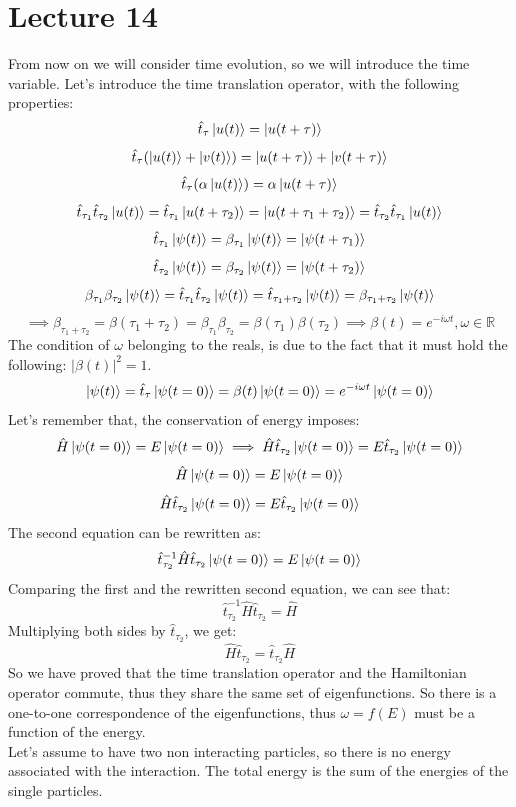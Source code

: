 \documentclass{article}
\begin{document}
\section{Lecture 14} 
From now on we will consider time evolution, so we will introduce the time variable. 
Let's introduce the time translation operator, with the following properties:
$$\hat{t}_{\tau} \ket{u(t)} = \ket{u(t+\tau)}$$
$$\hat{t}_{\tau}(\ket{u(t)}+\ket{v(t)}) = \ket{u(t+\tau)}+ \ket{v(t+\tau)}$$
$$\hat{t}_{\tau}(\alpha\ket{u(t)}) = \alpha \ket{u(t+\tau)}$$
$$\hat{t}_{\tau_1} \hat{t}_{\tau_2} \ket{u(t)} = \hat{t}_{\tau_1}\ket{u(t+\tau_2)}=\ket{u(t+\tau_1+\tau_2)}= \hat{t}_{\tau_2}\hat{t}_{\tau_1}\ket{u(t)}$$
$$\hat{t}_{\tau_1}\ket{\psi(t)} = \beta_{\tau_1}\ket{\psi(t)}= \ket{\psi(t+\tau_1)}$$
$$\hat{t}_{\tau_2}\ket{\psi(t)} = \beta_{\tau_2}\ket{\psi(t)}= \ket{\psi(t+\tau_2)}$$
$$\beta_{\tau_1}\beta_{\tau_2}\ket{\psi(t)}=\hat{t}_{\tau_1} \hat{t}_{\tau_2} \ket{\psi(t)} = \hat{t}_{\tau_1+\tau_2} \ket{\psi(t)} = \beta_{\tau_1+\tau_2}\ket{\psi(t)}$$
$$\implies \beta_{\tau_1+\tau_2} = \beta(\tau_1+\tau_2) = \beta_{\tau_1}\beta_{\tau_2} = \beta(\tau_1)\beta(\tau_2) \implies \beta(t) = e^{-i\omega t}, \omega \in \mathbb{R}$$
The condition of $\omega$ belonging to the reals, is due to the fact that it must hold the following: $|\beta(t)|^2 = 1$.
$$\ket{\psi(t)} = \hat{t}_\tau \ket{\psi(t=0)} = \beta(t)\ket{\psi(t=0)}=e^{-i\omega t} \ket{\psi(t=0)}$$
Let's remember that, the conservation of energy imposes:
$$\hat{H}\ket{\psi(t=0)} = E \ket{\psi(t=0)} \implies \hat{H}\hat{t}_{\tau_2}\ket{\psi(t=0)} = E \hat{t}_{\tau_2} \ket{\psi(t=0)}$$
$$\hat{H} \ket{\psi(t=0)} = E \ket{\psi(t=0)} $$
$$\hat{H} \hat{t}_{\tau_2} \ket{\psi(t=0)} = E \hat{t}_{\tau_2} \ket{\psi(t=0)}$$
The second equation can be rewritten as:
$$\hat{t}_{\tau_2}^{-1} \hat{H} \hat{t}_{\tau_2} \ket{\psi(t=0)} = E \ket{\psi(t=0)}
$$
Comparing the first and the rewritten second equation, we can see that:
$$\hat{t}_{\tau_2}^{-1} \hat{H} \hat{t}_{\tau_2} = \hat{H}$$
Multiplying both sides by $\hat{t}_{\tau_2}$, we get:
$$
\hat{H} \hat{t}_{\tau_2} = \hat{t}_{\tau_2} \hat{H}
$$
So we have proved that the time translation operator and the Hamiltonian operator commute, thus they share the same set of eigenfunctions. So there is a one-to-one correspondence of the eigenfunctions, thus $\omega  = f(E)$ must be a function of the energy.\\
Let's assume to have two non interacting particles, so there is no energy associated with the interaction. The total energy is the sum of the energies of the single particles.
\end{document}
